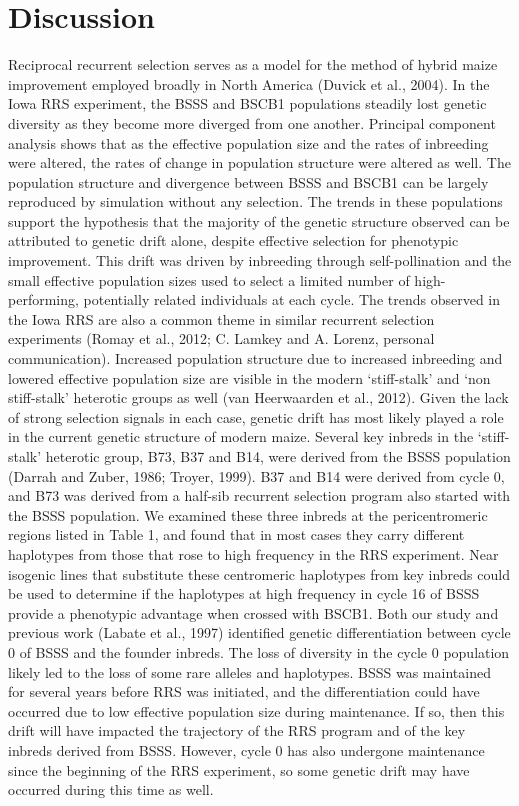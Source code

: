 \section*{Discussion}
Reciprocal recurrent selection serves as a model for the method of hybrid maize improvement employed broadly in North America (Duvick et al., 2004). In the Iowa RRS experiment, the BSSS and BSCB1 populations steadily lost genetic diversity as they become more diverged from one another. Principal component analysis shows that as the effective population size and the rates of inbreeding were altered, the rates of change in population structure were altered as well. The population structure and divergence between BSSS and BSCB1 can be largely reproduced by simulation without any selection. The trends in these populations support the hypothesis that the majority of the genetic structure observed can be attributed to genetic drift alone, despite effective selection for phenotypic improvement. This drift was driven by inbreeding through self-pollination and the small effective population sizes used to select a limited number of high-performing, potentially related individuals at each cycle.  The trends observed in the Iowa RRS are also a common theme in similar recurrent selection experiments (Romay et al., 2012; C. Lamkey and A. Lorenz, personal communication). Increased population structure due to increased inbreeding and lowered effective population size are visible in the modern ‘stiff-stalk’ and ‘non stiff-stalk’ heterotic groups as well (van Heerwaarden et al., 2012). Given the lack of strong selection signals in each case, genetic drift has most likely played a role in the current genetic structure of modern maize. 
	Several key inbreds in the ‘stiff-stalk’ heterotic group, B73, B37 and B14, were derived from the BSSS population (Darrah and Zuber, 1986; Troyer, 1999). B37 and B14 were derived from cycle 0, and B73 was derived from a half-sib recurrent selection program also started with the BSSS population. We examined these three inbreds at the pericentromeric regions listed in Table 1, and found that in most cases they carry different haplotypes from those that rose to high frequency in the RRS experiment.  Near isogenic lines that substitute these centromeric haplotypes from key inbreds could be used to determine if the haplotypes at high frequency in cycle 16 of BSSS provide a phenotypic advantage when crossed with BSCB1. 
	Both our study and previous work (Labate et al., 1997) identified genetic differentiation between cycle 0 of BSSS and the founder inbreds. The loss of diversity in the cycle 0 population likely led to the loss of some rare alleles and haplotypes. BSSS was maintained for several years before RRS was initiated, and the differentiation could have occurred due to low effective population size during maintenance. If so, then this drift will have impacted the trajectory of the RRS program and of the key inbreds derived from BSSS. However, cycle 0 has also undergone maintenance since the beginning of the RRS experiment, so some genetic drift may have occurred during this time as well.
